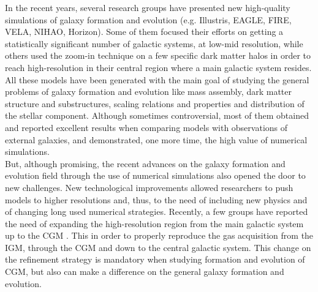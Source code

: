 \documentclass[oneside, a4paper, onecolumn, 11pt]{article}
\begin{document}
In the recent years, several research groups have presented new high-quality simulations of galaxy formation and evolution (e.g. Illustris, EAGLE, FIRE, VELA, NIHAO, Horizon). Some of them focused their efforts on getting a statistically significant number of galactic systems, at low-mid resolution, while others used the zoom-in technique on a few specific dark matter halos in order to reach high-resolution in their central region where a main galactic system resides. All these models have been generated with the main goal of studying the general problems of galaxy formation and evolution like mass assembly, dark matter structure and substructures, scaling relations and properties and distribution of the stellar component. Although sometimes controversial, most of them obtained and reported excellent results when comparing models with observations of external galaxies, and demonstrated, one more time, the high value of numerical simulations.\\
But, although promising, the recent advances on the galaxy formation and evolution field through the use of numerical simulations also opened the door to new challenges. New technological improvements allowed researchers to push models to higher resolutions and, thus, to the need of including new physics and of changing long used numerical strategies. Recently, a few groups have reported the need of expanding the high-resolution region from the main galactic system up to the CGM \citep{Hummels2018}. This in order to properly reproduce the gas acquisition from the IGM, through the CGM and down to the central galactic system. This change on the refinement strategy is mandatory when studying formation and evolution of CGM, but also can make a difference on the general galaxy formation and evolution.\\
\end{document}
